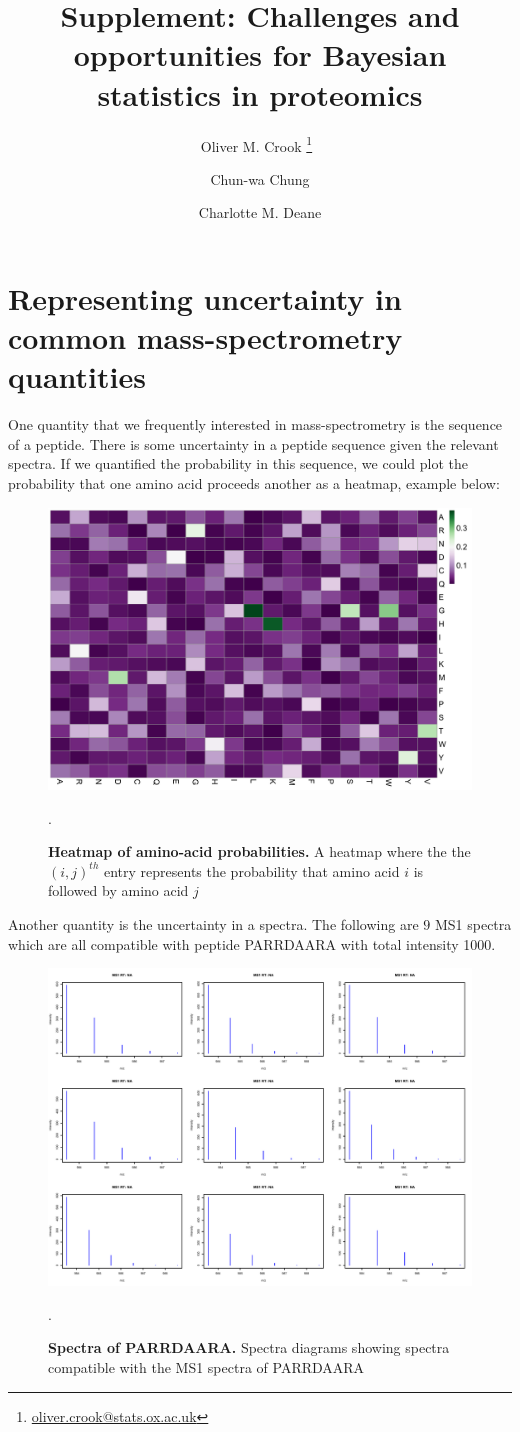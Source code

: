 \documentclass[12pt,english, journal=jpr, layout=twocolumn]{article}
\title{Supplement: Challenges and opportunities for Bayesian statistics in proteomics}
\author[1]{Oliver M. Crook \thanks{\url{oliver.crook@stats.ox.ac.uk}}~}
\author[2]{Chun-wa Chung}
\author[1]{Charlotte M. Deane}
\begin{document}
	
\section{Representing uncertainty in common mass-spectrometry quantities}
One quantity that we frequently interested in mass-spectrometry is the sequence of a peptide. There is some uncertainty in a peptide sequence given the relevant spectra. If we quantified the probability in this sequence, we could plot the probability that one amino acid proceeds another as a heatmap, example below:

\begin{figure}[H]
	\centering
	\includegraphics[width =1\textwidth]{probabilityaminoacids.pdf}
	\caption{\textbf{Heatmap of amino-acid probabilities.} A heatmap where the the $(i,j)^{th}$ entry represents the probability that amino acid $i$ is followed by amino acid $j$}.
	\label{figure::figure1aa}
\end{figure}

Another quantity is the uncertainty in a spectra. The following are $9$ MS1 spectra which are all compatible with peptide PARRDAARA with total intensity 1000.
	
\begin{figure}[H]
	\centering
	\includegraphics[width =1\textwidth]{aaMS1example.pdf}
	\caption{\textbf{Spectra of PARRDAARA.} Spectra diagrams showing spectra compatible with the MS1 spectra of PARRDAARA}.
	\label{figure::figure2spectraexample}
\end{figure}
\end{document}
